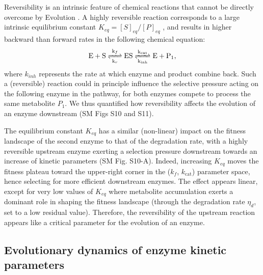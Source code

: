 \documentclass[nogrid,crop,final]{MBE2}%
\begin{document}
Reversibility is an intrinsic feature of chemical reactions that cannot be directly overcome by Evolution \citep{Haldane30,Cornish-Bowden79a}. A highly reversible reaction corresponds to a large intrinsic equilibrium constant $K_{eq}=[S]_{eq}/[P]_{eq}$ \citep{Klipp94}, and results in higher backward than forward rates in the following chemical equation: \begin{equation}
\ce{ E + S <=>[k_{f}][k_{r}] ES <=>[k_{cat}][k_{inh}] E + P_1 },
\label{chemMM_fullrev}
\end{equation}
where $k_{inh}$ represents the rate at which enzyme and product combine back. Such a (reversible) reaction could in principle influence the selective pressure acting on the following enzyme in the pathway, for both enzymes compete to process the same metabolite $P_1$. We thus quantified how reversibility affects the evolution of an enzyme downstream (SM Figs S10 and S11). 

The equilibrium constant $K_{eq}$ has a similar (non-linear) impact on the fitness landscape of the second enzyme to that of the degradation rate, with a highly reversible upstream enzyme exerting a selection pressure downstream towards an increase of kinetic parameters (SM Fig. S10-A). Indeed, increasing $K_{eq}$ moves the fitness plateau toward the upper-right corner in the ($k_f$, $k_\text{cat}$) parameter space, hence selecting for more efficient downstream enzymes. The effect appears linear, except for very low values of $K_{eq}$ where metabolite accumulation exerts a dominant role in shaping the fitness landscape (through the degradation rate $\eta_d$, set to a low residual value). Therefore, the reversibility of the upstream reaction appears like a critical parameter for the evolution of an enzyme. 


\subsection{Evolutionary dynamics of enzyme kinetic parameters}
\end{document}
